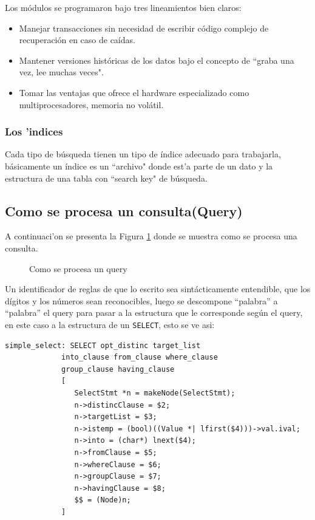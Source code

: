 Los m\'odulos se programaron bajo tres lineamientos bien claros:
\begin{itemize}
\item Manejar transacciones sin necesidad de escribir c\'odigo complejo de recuperaci\'on en caso de ca\'idas.
\item Mantener versiones hist\'oricas  de los datos bajo el concepto de ``graba una vez, lee muchas veces".
\item Tomar las ventajas que ofrece el hardware especializado como multiprocesadores, memoria no vol\'atil.  
\end{itemize}
\subsubsection{Los 'indices}
Cada tipo de b\'usqueda tienen un tipo de \'indice adecuado para trabajarla, b\'asicamente un \'indice es un ``archivo" donde est'a parte de un dato y la estructura de una tabla con ``search key" de b\'usqueda.
\subsection{Como se procesa un consulta(Query)}
A continuaci'on se presenta la Figura \ref{fig:comoprocesaquery2} donde se muestra como se procesa una consulta.
\begin{figure}[H]
\centering
{}
\caption{Como se procesa un query \cite{postgresqlpordentro}} 
\label{fig:comoprocesaquery2}
\end{figure}

Un identificador de reglas de que lo escrito sea sint\'acticamente entendible, que los d\'igitos y los n\'umeros sean reconocibles, luego se descompone ``palabra'' a ``palabra'' el query para pasar a la estructura que le corresponde seg\'un el query, en este caso a la estructura de un \texttt{SELECT}, esto se ve asi:
\lstset{language=sql,breaklines=true}
\label{fig:codigosqlc}
\begin{lstlisting}
simple_select: SELECT opt_distinc target_list
			 into_clause from_clause where_clause
			 group_clause having_clause
			 [
			 	SelectStmt *n = makeNode(SelectStmt);
			 	n->distincClause = $2;
			 	n->targetList = $3;
			 	n->istemp = (bool)((Value *| lfirst($4)))->val.ival;
			 	n->into = (char*) lnext($4);
			 	n->fromClause = $5;
			 	n->whereClause = $6;
				n->groupClause = $7;
				n->havingClause = $8;
				$$ = (Node)n;			 	
			 ]	
\end{lstlisting}

